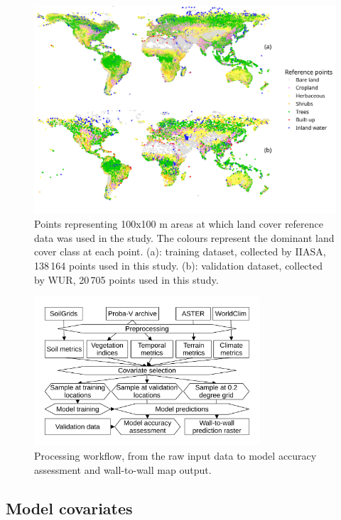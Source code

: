 \documentclass[review,authoryear,3p]{elsarticle}
\begin{document}
\begin{figure}
 \includegraphics[width=\textwidth]{article/article-figures/maps/2020-07-06-training-and-validation}
 \caption{Points representing 100x100 m areas at which land cover reference data was used in the study. The colours represent the dominant land cover class at each point. (a): training dataset, collected by \gls{IIASA}, 138\,164 points used in this study. (b): validation dataset, collected by \gls{WUR}, 20\,705 points used in this study.}
 \label{fig-reference-data}
\end{figure}

\begin{figure}
 \centering
 \includegraphics[width=0.75\textwidth]{article-figures/flowcharts/2020-07-10-flowchart}
 \caption{Processing workflow, from the raw input data to model accuracy assessment and wall-to-wall map output.}
 \label{fig-processing}
\end{figure}

\subsection{Model covariates}
\end{document}
